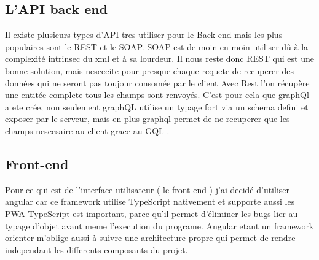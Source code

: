 \subsection{L'API back end}\label{subsec:l'api-back-end}
Il existe plusieurs types d'API tres utiliser pour le Back-end mais les plus populaires sont le REST et le SOAP.
SOAP est de moin en moin utiliser dû à la complexité intrinsec du xml et à sa lourdeur.
Il nous reste donc REST qui est une bonne solution, mais nescecite pour presque chaque requete de recuperer des données qui ne seront pas toujour consomée par le client
Avec Rest l'on récupère une entitée complete tous les champs sont renvoyés.
C'est pour cela que graphQl a ete crée, non seulement graphQL utilise un typage fort via un schema defini et exposer par le serveur,
mais en plus graphql permet de ne recuperer que les champs nescesaire au client grace au GQL .




\subsection{Front-end}\label{subsec:front-end}
Pour ce qui est de l'interface utilisateur ( le front end ) j'ai decidé d'utiliser angular car ce framework utilise TypeScript nativement et supporte aussi les PWA
TypeScript est important, parce qu'il permet d'éliminer les bugs lier au typage d'objet avant meme l'execution du programe.
Angular etant un framework orienter m'oblige aussi à suivre une architecture propre qui permet de rendre independant les differents composants du projet.
